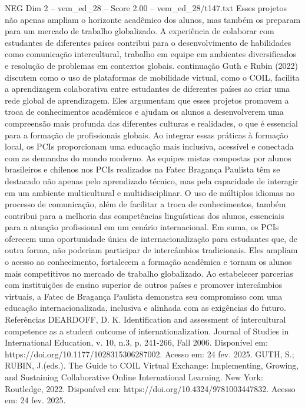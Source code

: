 \begin{textsample}{NEG Dim 2 – vem\_ed\_28 – Score 2.00 – vem\_ed\_28/t147.txt}
Esses projetos não apenas ampliam o horizonte acadêmico dos alunos, mas também os preparam para um mercado de trabalho globalizado.
A experiência de colaborar com estudantes de diferentes países contribui para o desenvolvimento de habilidades como comunicação intercultural, trabalho em equipe em ambientes diversificados e resolução de problemas em contextos globais. continuação Guth e Rubin (2022) discutem como o uso de plataformas de mobilidade virtual, como o COIL, facilita a aprendizagem colaborativa entre estudantes de diferentes países ao criar uma rede global de aprendizagem.
Eles argumentam que esses projetos promovem a troca de conhecimentos acadêmicos e ajudam os alunos a desenvolverem uma compreensão mais profunda das diferentes culturas e realidades, o que é essencial para a formação de profissionais globais.
Ao integrar essas práticas à formação local, os PCIs proporcionam uma educação mais inclusiva, acessível e conectada com as demandas do mundo moderno.
As equipes mistas compostas por alunos brasileiros e chilenos nos PCIs realizados na Fatec Bragança Paulista têm se destacado não apenas pelo aprendizado técnico, mas pela capacidade de interagir em um ambiente multicultural e multidisciplinar.
O uso de múltiplos idiomas no processo de comunicação, além de facilitar a troca de conhecimentos, também contribui para a melhoria das competências linguísticas dos alunos, essenciais para a atuação profissional em um cenário internacional.
Em suma, os PCIs oferecem uma oportunidade única de internacionalização para estudantes que, de outra forma, não poderiam participar de intercâmbios tradicionais.
Eles ampliam o acesso ao conhecimento, fortalecem a formação acadêmica e tornam os alunos mais competitivos no mercado de trabalho globalizado.
Ao estabelecer parcerias com instituições de ensino superior de outros países e promover intercâmbios virtuais, a Fatec de Bragança Paulista demonstra seu compromisso com uma educação internacionalizada, inclusiva e alinhada com as exigências do futuro.
Referências DEARDOFF, D.
K.
Identification and assessment of intercultural competence as a student outcome of internationalization.
Journal of Studies in International Education, v. 10, n.3, p. 241-266, Fall 2006.
Disponível em: https://doi.org/10.1177/1028315306287002.
Acesso em: 24 fev. 2025.
GUTH, S.; RUBIN, J.(eds.).
The Guide to COIL Virtual Exchange: Implementing, Growing, and Sustaining Collaborative Online International Learning.
New York: Routledge, 2022.
Disponível em: https://doi.org/10.4324/9781003447832.
Acesso em: 24 fev. 2025.

\end{textsample}
